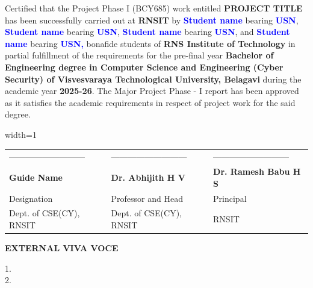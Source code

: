 Certified that the Project Phase I (BCY685) work  entitled \textcolor{color3}{\textbf{PROJECT TITLE}} has been successfully carried out at \textbf{RNSIT} by \textcolor{blue} {\textbf{Student name}} bearing   \textcolor{blue}{\textbf{USN}}, \textcolor{blue} {\textbf{Student name}} bearing \textcolor{blue}{\textbf{USN}}, \textcolor{blue}{\textbf{Student name}} bearing \textcolor{blue}{\textbf{USN}}, and \textcolor{blue} {\textbf{Student name}} bearing \textcolor{blue}{\textbf{USN,}} bonafide students of \textbf { RNS Institute of Technology} in partial fulfillment of the requirements for the pre-final year \textbf{Bachelor of Engineering degree in Computer Science and Engineering (Cyber Security) of Visvesvaraya Technological University, Belagavi} during the academic year \textbf{2025-26}. The Major Project Phase - I report has been approved as it satisfies the academic requirements in respect of project work for the said degree.	
\\	
\vspace{-0.1 cm}
\begin{center}
    \begin{table}[ht]
    \begin{adjustbox}{width=1\textwidth}
    \centering
        \begin{tabular}{p{5.5cm} p{5.5cm} p{5.5cm} }
        --------------------------- & --------------------------- & --------------------------- \\
        \textbf{Guide Name }&  \textbf{Dr. Abhijith H V}& \textbf{Dr. Ramesh Babu H S} 
        \\Designation &  Professor and Head & Principal 
        \\Dept. of CSE(CY), RNSIT & Dept. of CSE(CY), RNSIT & RNSIT
        \end{tabular}
    \end{adjustbox}
    \end{table} 
\end{center}

\vspace{-1.0 cm}

\centering 
\textbf{EXTERNAL VIVA VOCE} \\
\vspace{-0.5 cm}
\begin{flushleft}
1. \\ 2.
\end{flushleft}
\thispagestyle{empty}